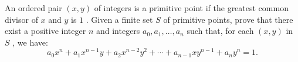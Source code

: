 An ordered pair 
$(x, y)$
 of integers is a primitive point if the greatest common divisor of 
$x$
 and 
$y$
 is 
$1$
.
 Given a finite set 
$S$
 of primitive points, prove that there exist a positive integer 
$n$
 and integers 
$a_0, a_1, \ldots , a_n$
 such that, for each 
$(x, y)$
 in 
$S$
,
 we have:
$$a_0x^n + a_1x^{n-1} y + a_2x^{n-2}y^2 + \cdots + a_{n-1}xy^{n-1} + a_ny^n = 1.$$
